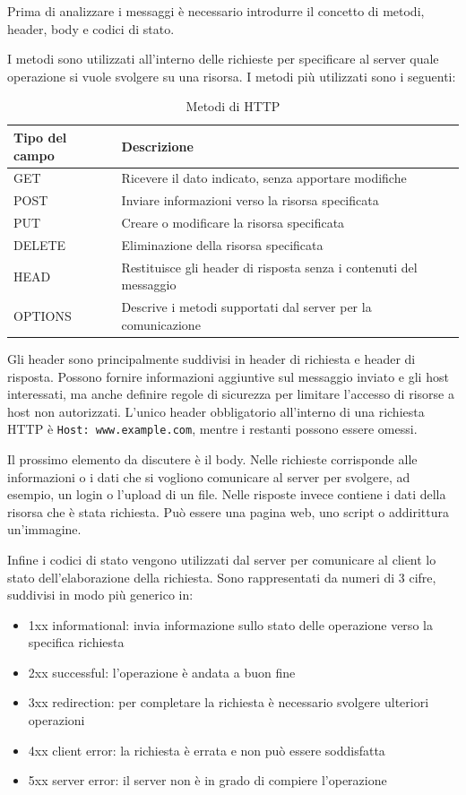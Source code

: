 \documentclass[12pt]{report}
\begin{document}
Prima di analizzare i messaggi è necessario introdurre il concetto di metodi, header, body e codici di stato.

I metodi sono utilizzati all'interno delle richieste per specificare al server quale operazione si vuole svolgere su una risorsa. I metodi più utilizzati sono i seguenti:
\begin{table}[htbp]
\centering
\begin{tabular}{@{}m{3cm}m{11cm}@{}}
\toprule
\textbf{Tipo del campo} & \textbf{Descrizione} \\ \midrule
GET & Ricevere il dato indicato, senza apportare modifiche \\ \hline
POST & Inviare informazioni verso la risorsa specificata \\ \hline
PUT & Creare o modificare la risorsa specificata\\ \hline
DELETE & Eliminazione della risorsa specificata \\ \hline
HEAD & Restituisce gli header di risposta senza i contenuti del messaggio \\ \hline
OPTIONS & Descrive i metodi supportati dal server per la comunicazione \\ \bottomrule
\end{tabular}
\caption{Metodi di HTTP}
\label{tab:metodi_HTTP}
\end{table}

Gli header sono principalmente suddivisi in header di richiesta e header di risposta. Possono fornire informazioni aggiuntive sul messaggio inviato e gli host interessati, ma anche definire regole di sicurezza per limitare l'accesso di risorse a host non autorizzati. L'unico header obbligatorio all'interno di una richiesta HTTP è \lstinline{Host: www.example.com}, mentre i restanti possono essere omessi.

Il prossimo elemento da discutere è il body. Nelle richieste corrisponde alle informazioni o i dati che si vogliono comunicare al server per svolgere, ad esempio, un login o l'upload di un file. Nelle risposte invece contiene i dati della risorsa che è stata richiesta. Può essere una pagina web, uno script o addirittura un'immagine. 

Infine i codici di stato vengono utilizzati dal server per comunicare al client lo stato dell'elaborazione della richiesta. Sono rappresentati da numeri di 3 cifre, suddivisi in modo più generico in:
\begin{itemize}
    \item 1xx informational: invia informazione sullo stato delle operazione verso la specifica richiesta
    \item 2xx successful: l'operazione è andata a buon fine
    \item 3xx redirection: per completare la richiesta è necessario svolgere ulteriori operazioni
    \item 4xx client error: la richiesta è errata e non può essere soddisfatta
    \item 5xx server error: il server non è in grado di compiere l'operazione
\end{itemize}
\end{document}
